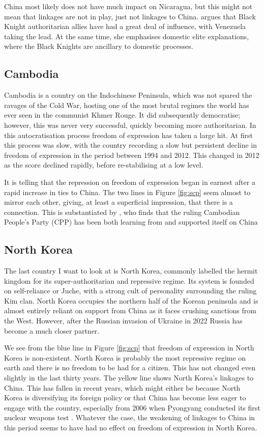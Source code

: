 China most likely does not have much impact on Nicaragua, but this might not mean that linkages are not in play, just not linkages to China. \citet[p. 198]{mcconnell_elite_2024} argues that Black Knight authoritarian allies have had a great deal of influence, with Venezuela taking the lead. At the same time, she emphasises domestic elite explanations, where the Black Knights are ancillary to domestic processes.

\subsection{Cambodia}
Cambodia is a country on the Indochinese Peninsula, which was not spared the ravages of the Cold War, hosting one of the most brutal regimes the world has ever seen in the communist Khmer Rouge. It did subsequently democratise; however, this was never very successful, quickly becoming more authoritarian. In this autocratisation process freedom of expression has taken a large hit. At first this process was slow, with the country recording a slow but persistent decline in freedom of expression in the period between 1994 and 2012. This changed in 2012 as the score declined rapidly, before re-stabilising at a low level.

It is telling that the repression on freedom of expression began in earnest after a rapid increase in ties to China. The two lines in Figure \ref{fig:scp} seem almost to mirror each other, giving, at least a superficial impression, that there is a connection. This is substantiated by \citet{loughlin_chinese_2021}, who finds that the ruling Cambodian People's Party (CPP) has been both learning from and supported itself on China

\subsection{North Korea}
The last country I want to look at is North Korea, commonly labelled the hermit kingdom for its super-authoritarian and repressive regime. Its system is founded on self-reliance or Juche, with a strong cult of personality surrounding the ruling Kim clan. North Korea occupies the northern half of the Korean peninsula and is almost entirely reliant on support from China as it faces crushing sanctions from the West. However, after the Russian invasion of Ukraine in 2022 Russia has become a much closer partner.

We see from the blue line in Figure \ref{fig:scp} that freedom of expression in North Korea is non-existent. North Korea is probably the most repressive regime on earth and there is no freedom to be had for a citizen. This has not changed even slightly in the last thirty years. The yellow line shows North Korea's linkages to China. This has fallen in recent years, which might either be because North Korea is diversifying its foreign policy or that China has become less eager to engage with the country, especially from 2006 when Pyongyang conducted its first nuclear weapons test \citep{fong_understanding_2024}. Whatever the case, the weakening of linkages to China in this period seems to have had no effect on freedom of expression in North Korea.

